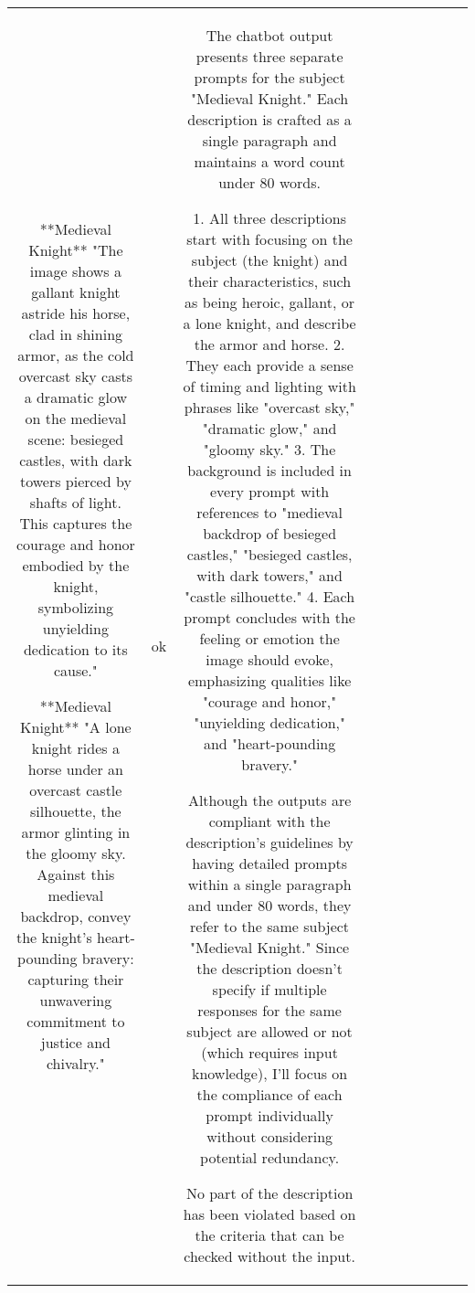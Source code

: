 \begin{table}[h!]
\begin{tabular}{|c|c|c|c|c|c|c|c|c|c|}
**Medieval Knight**
"The image shows a gallant knight astride his horse, clad in shining armor, as the cold overcast sky casts a dramatic glow on the medieval scene: besieged castles, with dark towers pierced by shafts of light. This captures the courage and honor embodied by the knight, symbolizing unyielding dedication to its cause."

**Medieval Knight**
"A lone knight rides a horse under an overcast castle silhouette, the armor glinting in the gloomy sky. Against this medieval backdrop, convey the knight's heart-pounding bravery: capturing their unwavering commitment to justice and chivalry." & ok & The chatbot output presents three separate prompts for the subject "Medieval Knight." Each description is crafted as a single paragraph and maintains a word count under 80 words. 

1. All three descriptions start with focusing on the subject (the knight) and their characteristics, such as being heroic, gallant, or a lone knight, and describe the armor and horse.
2. They each provide a sense of timing and lighting with phrases like "overcast sky," "dramatic glow," and "gloomy sky."
3. The background is included in every prompt with references to "medieval backdrop of besieged castles," "besieged castles, with dark towers," and "castle silhouette."
4. Each prompt concludes with the feeling or emotion the image should evoke, emphasizing qualities like "courage and honor," "unyielding dedication," and "heart-pounding bravery."

Although the outputs are compliant with the description's guidelines by having detailed prompts within a single paragraph and under 80 words, they refer to the same subject "Medieval Knight." Since the description doesn't specify if multiple responses for the same subject are allowed or not (which requires input knowledge), I'll focus on the compliance of each prompt individually without considering potential redundancy.

No part of the description has been violated based on the criteria that can be checked without the input.


\end{tabular}
\end{table}
